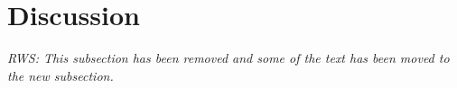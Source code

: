 \documentclass{ametsoc}
\begin{document}
\section{Discussion}

\emph{RWS: This subsection has been removed and some of the text has been moved to the new subsection.}


\end{document}
